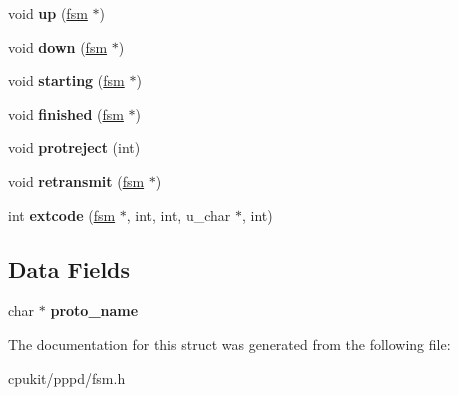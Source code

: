 \begin{DoxyCompactItemize}
void {\bfseries up} (\mbox{\hyperlink{structfsm}{fsm}} $\ast$)
\item 
\mbox{\label{structfsm__callbacks_a406c343c5ab23eb3d0fc49f87785f8fd}} 
void {\bfseries down} (\mbox{\hyperlink{structfsm}{fsm}} $\ast$)
\item 
\mbox{\label{structfsm__callbacks_a8ab79dd7d9d14fe243926ef35a550ef2}} 
void {\bfseries starting} (\mbox{\hyperlink{structfsm}{fsm}} $\ast$)
\item 
\mbox{\label{structfsm__callbacks_ae348c44452f9fe9da399b15539a9bbef}} 
void {\bfseries finished} (\mbox{\hyperlink{structfsm}{fsm}} $\ast$)
\item 
\mbox{\label{structfsm__callbacks_adb2d83ea941dbaae56e19912d411f37e}} 
void {\bfseries protreject} (int)
\item 
\mbox{\label{structfsm__callbacks_a12491e74343e56590b4f15244d277f28}} 
void {\bfseries retransmit} (\mbox{\hyperlink{structfsm}{fsm}} $\ast$)
\item 
\mbox{\label{structfsm__callbacks_ad6ea551d909a7500a5888b50087ce3d5}} 
int {\bfseries extcode} (\mbox{\hyperlink{structfsm}{fsm}} $\ast$, int, int, u\+\_\+char $\ast$, int)
\end{DoxyCompactItemize}
\subsection*{Data Fields}
\begin{DoxyCompactItemize}
\item 
\mbox{\label{structfsm__callbacks_aa35debcd7d6589ed37fef4057ac6bac3}} 
char $\ast$ {\bfseries proto\+\_\+name}
\end{DoxyCompactItemize}


The documentation for this struct was generated from the following file\+:\begin{DoxyCompactItemize}
\item 
cpukit/pppd/fsm.\+h\end{DoxyCompactItemize}
